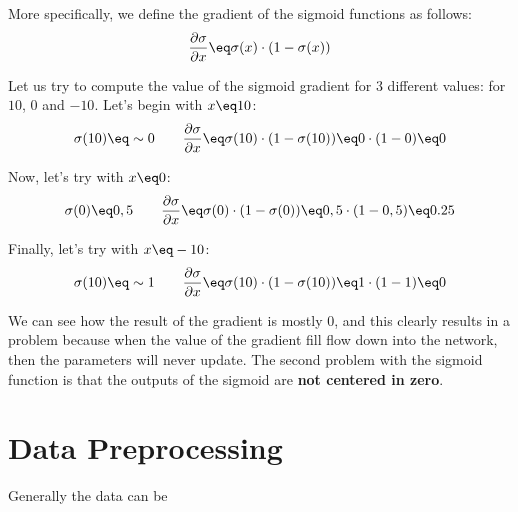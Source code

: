\begin{center}
\end{center}

More specifically, we define the gradient of the sigmoid functions as follows:
\[ \frac{\partial \sigma}{\partial x} \eq \sigma(x) \cdot (1 - \sigma(x)) \]

Let us try to compute the value of the sigmoid gradient for 3 different values: for $10$, $0$ and $-10$. Let's begin with $x \eq 10$:
\[ \sigma(10) \eq \sim 0 \quad \quad \frac{\partial \sigma}{\partial x} \eq \sigma(10) \cdot (1 - \sigma(10)) \eq 0 \cdot (1 - 0) \eq 0 \]

Now, let's try with $x \eq 0$:
\[ \sigma(0) \eq 0,5 \quad \quad \frac{\partial \sigma}{\partial x} \eq \sigma(0) \cdot (1 - \sigma(0)) \eq 0,5 \cdot (1 - 0,5) \eq 0.25 \]

Finally, let's try with $x \eq -10$:
\[ \sigma(10) \eq \sim 1 \quad \quad \frac{\partial \sigma}{\partial x} \eq \sigma(10) \cdot (1 - \sigma(10)) \eq 1 \cdot (1 - 1) \eq 0 \]

We can see how the result of the gradient is mostly 0, and this clearly results in a problem because when the value of the gradient fill flow down into the network, then the parameters will never update.
\nl
The second problem with the sigmoid function is that the outputs of the sigmoid are \textbf{not centered in zero}.

\section{Data Preprocessing}

Generally the data can be 